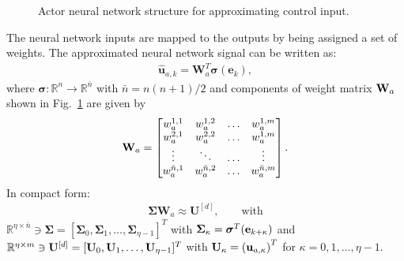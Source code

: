 \documentclass[journal,twoside,web]{ieeecolor}
\begin{document}
\begin{figure}
  \caption{Actor neural network structure for approximating control input.}
  \label{fig:nnActor}
\end{figure}

 
The neural network inputs are mapped to the outputs by being assigned a set of weights. 
The approximated neural network signal can be written as:
\begin{align}
  \label{eq:approximatePolicyActorWeights}
    \hat{\mathbf{u}}_{a,k} = \mathbf{W}_a^T\bm{\sigma}(\mathbf{e}_k),
  \end{align}
%
where $\bm{\sigma}:\mathbb{R}^n\to\mathbb{R}^{\bar{n}}$ with $\bar{n} = n(n+1)/2$ and components of weight matrix ${\bf W}_a$ shown in Fig.~\ref{fig:nnActor} are given by %
%
\begin{align*}
  {\bf W}_a = 
  \begin{bmatrix}
    w_a^{1,1} &  w_a^{1,2} & \ldots &w_a^{1,m}\\
    w_a^{2,1} & w_a^{2,2}& \ldots &w_a^{1,m}\\
    \vdots & \ddots & \ldots &\vdots\\
    w_a^{\bar{n},1} & w_a^{\bar{n},2}& \ldots &w_a^{\bar{n},m}
  \end{bmatrix}.
\end{align*}
%
In compact form:
  \begin{align*}
    \bm{\Sigma}\mathbf{W}_a \approx  \mathbf{U}^{[d]},\qquad\text{with}
  \end{align*}
  $\mathbb{R}^{\eta\times\bar{n}}\ni \bm{\Sigma} = [\bm{\Sigma}_0,\bm{\Sigma}_1,\ldots,\bm{\Sigma}_{\eta -1}]^T$ with $\bm{\Sigma}_\kappa = \bm{\sigma}^T({\bf e}_{k+\kappa})$ and $\mathbb{R}^{\eta\times m}\ni {\bf U}^{[d]} = [{\bf U}_0,{\bf U}_1,\ldots, {\bf U}_{\eta-1}]^T$ with ${\bf U}_\kappa = \left({\bf u}_{a,\kappa}\right)^T$ for $\kappa = 0,1,\ldots,\eta-1.$
\end{document}

